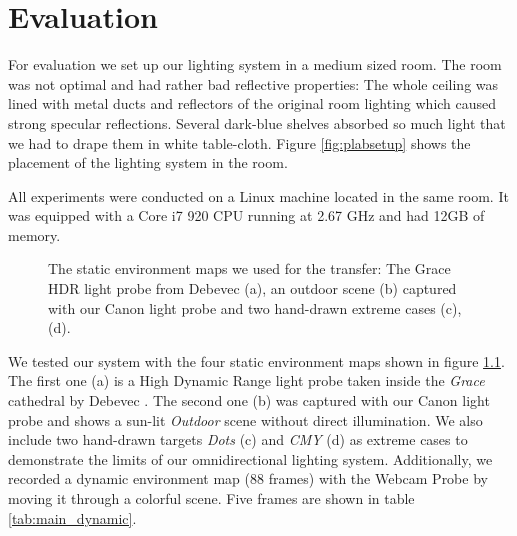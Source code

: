 \chapter{Evaluation}
\label{chap:evaluation}
  For evaluation we set up our lighting system in a medium sized room.
  The room was not optimal and had rather bad reflective properties: The whole ceiling was lined with metal ducts and reflectors of the original room lighting which caused strong specular reflections.
  Several dark-blue shelves absorbed so much light that we had to drape them in white table-cloth.
  Figure \ref{fig:plabsetup} shows the placement of the lighting system in the room.
     
  All experiments were conducted on a Linux machine located in the same room. 
  It was equipped with a Core i7 920 CPU  running at 2.67 GHz and had 12GB of memory.
  
  
  \begin{figure}[H]
    \hfill
    \hfill
    \hfill
    \caption[Static targets]{The static environment maps we used for the transfer: The Grace HDR light probe from Debevec (a), an outdoor scene (b) captured with our Canon light probe and two hand-drawn extreme cases (c), (d). }{}
    
    \label{fig:envmaps}
  \end{figure}
  
  We tested our system with the four static environment maps shown in figure \ref{fig:envmaps}. 
  The first one (a) is a High Dynamic Range light probe taken inside the \emph{Grace} cathedral by Debevec \cite{PROBES}. 
  The second one (b) was captured with our Canon light probe and shows a sun-lit \emph{Outdoor} scene without direct illumination.
  We also include two hand-drawn targets \emph{Dots} (c) and \emph{CMY} (d) as extreme cases to demonstrate the limits of our omnidirectional lighting system.
  Additionally, we recorded a dynamic environment map (88 frames) with the Webcam Probe by moving it through a colorful scene.
  Five frames are shown in table \ref{tab:main_dynamic}.
    
